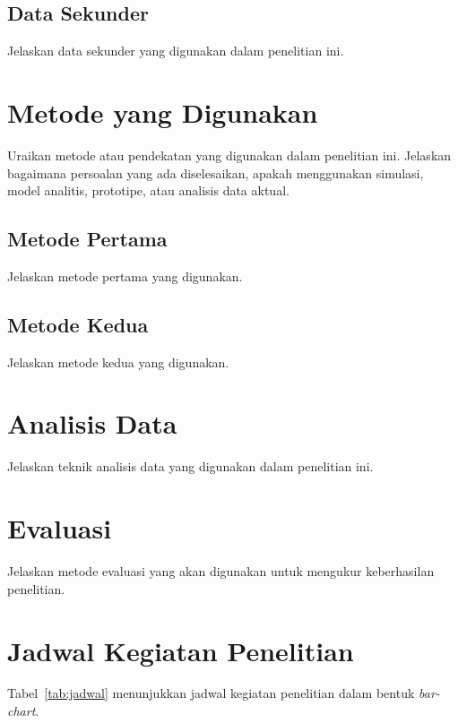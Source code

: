 \subsection{Data Sekunder}

Jelaskan data sekunder yang digunakan dalam penelitian ini.

\section{Metode yang Digunakan}

Uraikan metode atau pendekatan yang digunakan dalam penelitian ini. Jelaskan bagaimana persoalan yang ada diselesaikan, apakah menggunakan simulasi, model analitis, prototipe, atau analisis data aktual.

\subsection{Metode Pertama}

Jelaskan metode pertama yang digunakan.

\subsection{Metode Kedua}

Jelaskan metode kedua yang digunakan.

\section{Analisis Data}

Jelaskan teknik analisis data yang digunakan dalam penelitian ini.

\section{Evaluasi}

Jelaskan metode evaluasi yang akan digunakan untuk mengukur keberhasilan penelitian.

\section{Jadwal Kegiatan Penelitian}

Tabel~\ref{tab:jadwal} menunjukkan jadwal kegiatan penelitian dalam bentuk \textit{bar-chart}.

